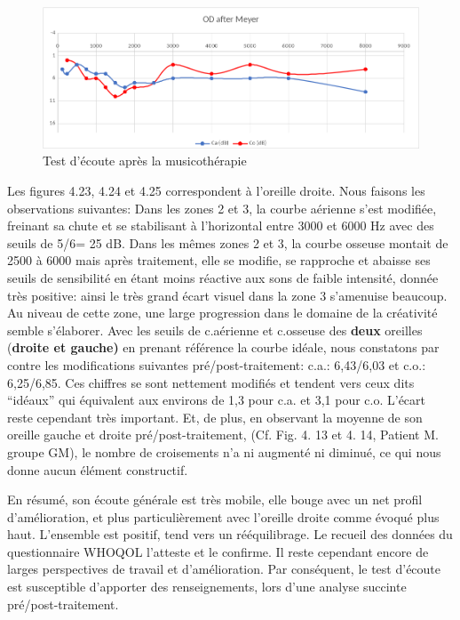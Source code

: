  	\begin{figure}[h]
 		\centering

 		\includegraphics[width=0.7\linewidth]{images/clinique/od_after_meyer.png}
 		\caption{Test d'écoute après la musicothérapie}
 		\label{fig:odaftermeyer}
 	\end{figure}
 Les figures 4.23, 4.24  et 4.25 correspondent à l'oreille droite.
        Nous faisons les observations suivantes:
      Dans les
        zones 2 et 3,  la courbe aérienne s'est modifiée, freinant sa
        chute et se stabilisant à l'horizontal entre 3000 et 6000 Hz
        avec des seuils de 5/6= 25 dB.
        Dans les mêmes zones 2 et 3, la
        courbe osseuse montait de 2500 à 6000 mais après traitement,
        elle se modifie, se rapproche et abaisse ses seuils de
        sensibilité en étant moins réactive aux sons de faible
        intensité, donnée très positive: ainsi le très grand écart visuel dans la zone 3 s'amenuise beaucoup. Au niveau de cette
        zone, une large progression dans
  le domaine de la créativité semble s'élaborer.
Avec les
  seuils
   de c.aérienne et c.osseuse des\textbf{ deux} oreilles (\textbf{droite et gauche)} en prenant
   référence la courbe idéale, nous
  constatons par contre les modifications suivantes pré/post-traitement:
  c.a.: 6,43/6,03 et c.o.: 6,25/6,85.
  Ces chiffres se sont nettement
  modifiés et tendent vers
  ceux dits ``idéaux''  qui équivalent aux environs de 1,3 pour
  c.a. et 3,1 pour c.o. L'écart reste cependant très important. %
  Et, de plus, en observant la moyenne de son oreille gauche et droite pré/post-traitement,
  (Cf. Fig. 4. 13 et 4. 14, Patient M. groupe GM), le
  nombre de croisements n'a ni augmenté ni diminué, ce qui nous donne
  aucun élément constructif.

  En résumé, son écoute générale est très mobile, elle bouge avec un
  net profil d'amélioration, et plus particulièrement avec l'oreille
  droite comme évoqué plus haut. L'ensemble est positif, tend vers un
  rééquilibrage. Le recueil des données du
  questionnaire WHOQOL l'atteste et le confirme.
  Il reste cependant encore de larges perspectives de travail et d'amélioration.
  Par conséquent, le test d'écoute est susceptible d'apporter des renseignements, lors
      d'une analyse succinte pré/post-traitement.
















